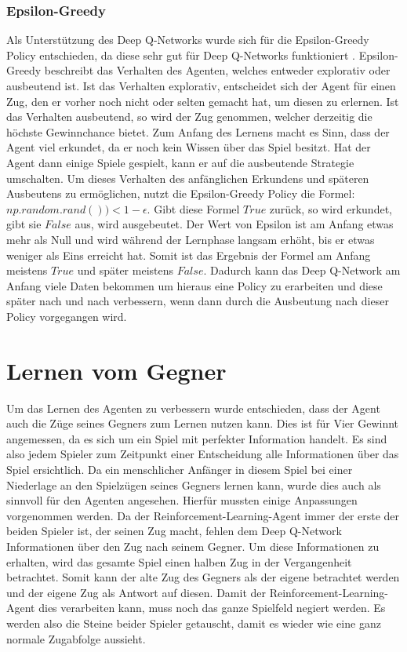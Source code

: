 \subsubsection{Epsilon-Greedy}
Als Unterstützung des Deep Q-Networks wurde sich für die Epsilon-Greedy Policy entschieden, da diese sehr gut für Deep Q-Networks funktioniert \cite{Meire2017}. Epsilon-Greedy beschreibt das Verhalten des Agenten, welches entweder explorativ oder ausbeutend ist. Ist das Verhalten explorativ, entscheidet sich der Agent für einen Zug, den er vorher noch nicht oder selten gemacht hat, um diesen zu erlernen. Ist das Verhalten ausbeutend, so wird der Zug genommen, welcher derzeitig die höchste Gewinnchance bietet. Zum Anfang des Lernens macht es Sinn, dass der Agent viel erkundet, da er noch kein Wissen über das Spiel besitzt. Hat der Agent dann einige Spiele gespielt, kann er auf die ausbeutende Strategie umschalten. Um dieses Verhalten des anfänglichen Erkundens und späteren Ausbeutens zu ermöglichen, nutzt die Epsilon-Greedy Policy die Formel: $np.random.rand())<1-\epsilon$. Gibt diese Formel $True$ zurück, so wird erkundet, gibt sie $False$ aus, wird ausgebeutet. Der Wert von Epsilon ist am Anfang etwas mehr als Null und wird während der Lernphase langsam erhöht, bis er etwas weniger als Eins erreicht hat. Somit ist das Ergebnis der Formel am Anfang meistens $True$ und später meistens $False$. Dadurch kann das Deep Q-Network am Anfang viele Daten bekommen um hieraus eine Policy zu erarbeiten und diese später nach und nach verbessern, wenn dann durch die Ausbeutung nach dieser Policy vorgegangen wird.


\section{Lernen vom Gegner}
Um das Lernen des Agenten zu verbessern wurde entschieden, dass der Agent auch die Züge seines Gegners zum Lernen nutzen kann. Dies ist für Vier Gewinnt angemessen, da es sich um ein Spiel mit perfekter Information handelt. Es sind also jedem Spieler zum Zeitpunkt einer Entscheidung alle Informationen über das Spiel ersichtlich. Da ein menschlicher Anfänger in diesem Spiel bei einer Niederlage an den Spielzügen seines Gegners lernen kann, wurde dies auch als sinnvoll für den Agenten angesehen. Hierfür mussten einige Anpassungen vorgenommen werden. Da der Reinforcement-Learning-Agent immer der erste der beiden Spieler ist, der seinen Zug macht, fehlen dem Deep Q-Network Informationen über den Zug nach seinem Gegner. 
Um diese Informationen zu erhalten, wird das gesamte Spiel einen halben Zug in der Vergangenheit betrachtet. Somit kann der alte Zug des Gegners als der eigene betrachtet werden und der eigene Zug als Antwort auf diesen. Damit der Reinforcement-Learning-Agent dies verarbeiten kann, muss noch das ganze Spielfeld negiert werden. Es werden also die Steine beider Spieler getauscht, damit es wieder wie eine ganz normale Zugabfolge aussieht. 

